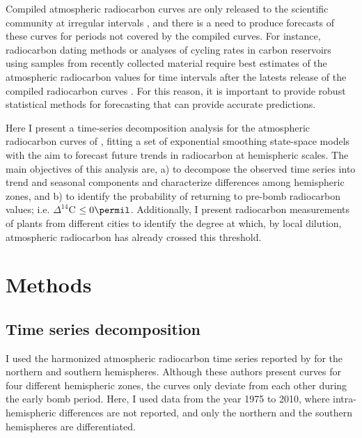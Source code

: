 
Compiled atmospheric radiocarbon curves are only released to the scientific community at irregular intervals \citep{Hua2004, Hua2013Radiocarbon}, and there is a need to produce forecasts of these curves for periods not covered by the compiled curves. For instance, radiocarbon dating methods or analyses of cycling rates in carbon reservoirs using samples from recently collected material require best estimates 
of the atmospheric radiocarbon values for time intervals after the latests release of the compiled radiocarbon curves \citep{SierraGMD14} . For this reason, it is important to provide robust statistical methods for forecasting that can provide accurate predictions. 

Here I present a time-series decomposition analysis for the atmospheric radiocarbon curves of \citet{Hua2013Radiocarbon}, fitting a set of exponential smoothing state-space models with the aim to forecast future trends in radiocarbon at hemispheric scales. The main objectives of this analysis are, a) to decompose the observed time series into trend and seasonal components and characterize differences among hemispheric zones, and b) to identify the probability of returning to pre-bomb radiocarbon values; i.e. $\Delta^{14}$C $\leq 0 \permil$. Additionally, I present radiocarbon measurements of plants from different cities to identify the degree at which, by local dilution, atmospheric radiocarbon has already crossed this threshold. 



\section{Methods}
\subsection{Time series decomposition} 
I used the harmonized atmospheric radiocarbon time series reported by \citet{Hua2013Radiocarbon} for the northern and southern hemispheres. Although these authors present curves for four different hemispheric zones, the curves only deviate from each other during
the early bomb period. Here, I used data from the year 1975 to 2010, where intra-hemispheric differences are not reported, and only
the northern and the southern hemispheres are differentiated. 

